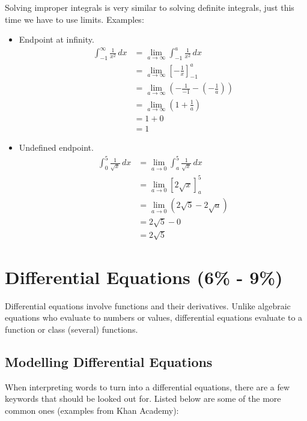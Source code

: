 \documentclass[12pt]{article}
\begin{document}
            Solving improper integrals is very similar to solving definite integrals, just this time we have to use limits. Examples:
            \begin{itemize}
                \item Endpoint at infinity.
                \begin{align*}
                    \int_{-1}^{\infty} \frac{1}{x^2} \, dx &= \lim_{a \to \infty} \int_{-1}^{a} \frac{1}{x^2} \, dx \\[6pt]
                    &= \lim_{a \to \infty} \left[ -\frac{1}{x} \right]_{-1}^{a} \\[6pt]
                    &= \lim_{a \to \infty} \left( -\frac{1}{-1} - \left( -\frac{1}{a} \right) \right) \\[6pt]
                    &= \lim_{a \to \infty} \left( 1 + \frac{1}{a} \right) \\[6pt]
                    &= 1+0 \\
                    &= 1
                \end{align*}

                \item Undefined endpoint.
                \begin{align*}
                    \int_{0}^{5} \frac{1}{\sqrt{x}} \, dx &= \lim_{a \to 0} \int_{a}^{5} \frac{1}{\sqrt{x}} \, dx \\[6pt]
                    &= \lim_{a \to 0} \left[ 2\sqrt{x} \right]_{a}^{5} \\
                    &= \lim_{a \to 0} \left( 2\sqrt{5} - 2\sqrt{a} \right) \\
                    &= 2\sqrt{5} - 0 \\
                    &= 2\sqrt{5}
                \end{align*}
            \end{itemize}

    \section{Differential Equations (6\% - 9\%)}
        Differential equations involve functions and their derivatives. Unlike algebraic equations who evaluate to numbers or values, differential equations evaluate to a function or class (several) functions.

        \subsection{Modelling Differential Equations}
            When interpreting words to turn into a differential equations, there are a few keywords that should be looked out for. Listed below are some of the more common ones (examples from Khan Academy):
\end{document}
